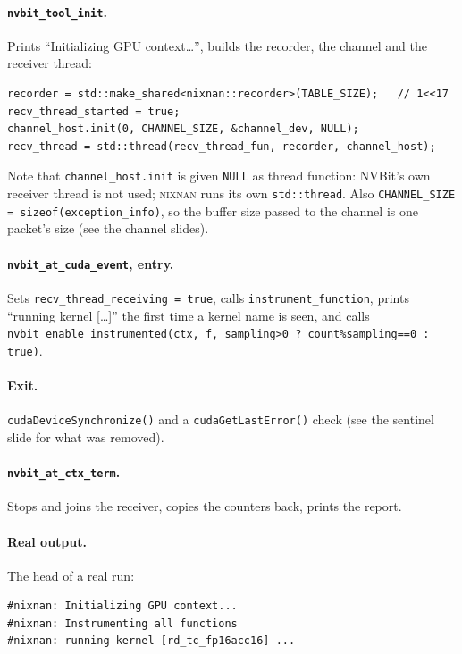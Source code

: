 \documentclass[11pt]{article}
\newcommand{\nn}{\textsc{nixnan}}
\begin{document}
\paragraph{\texttt{nvbit\_tool\_init}.} Prints ``Initializing GPU context\ldots'', builds the recorder, the channel and the receiver thread:
\begin{lstlisting}
recorder = std::make_shared<nixnan::recorder>(TABLE_SIZE);   // 1<<17
recv_thread_started = true;
channel_host.init(0, CHANNEL_SIZE, &channel_dev, NULL);
recv_thread = std::thread(recv_thread_fun, recorder, channel_host);
\end{lstlisting}
Note that \texttt{channel\_host.init} is given \texttt{NULL} as thread function: NVBit's own receiver thread is not used; \nn{} runs its own \texttt{std::thread}. Also \texttt{CHANNEL\_SIZE = sizeof(exception\_info)}, so the buffer size passed to the channel is one packet's size (see the channel slides).
\paragraph{\texttt{nvbit\_at\_cuda\_event}, entry.} Sets \texttt{recv\_thread\_receiving = true}, calls \texttt{instrument\_function}, prints ``running kernel [\ldots]'' the first time a kernel name is seen, and calls \texttt{nvbit\_enable\_instrumented(ctx, f, sampling>0 ? count\%sampling==0 : true)}.
\paragraph{Exit.} \texttt{cudaDeviceSynchronize()} and a \texttt{cudaGetLastError()} check (see the sentinel slide for what was removed).
\paragraph{\texttt{nvbit\_at\_ctx\_term}.} Stops and joins the receiver, copies the counters back, prints the report.
\paragraph{Real output.} The head of a real run:
\begin{lstlisting}
#nixnan: Initializing GPU context...
#nixnan: Instrumenting all functions
#nixnan: running kernel [rd_tc_fp16acc16] ...
\end{lstlisting}
\end{document}
